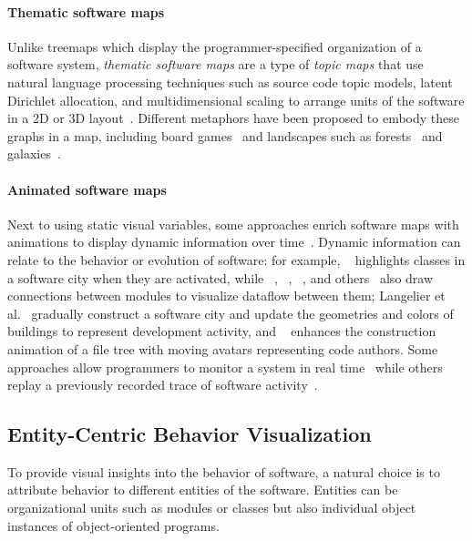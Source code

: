 \paragraph{Thematic software maps}

Unlike treemaps which display the pro\-gram\-mer-specified organization of a software system, \emph{thematic software maps} are a type of \emph{topic maps} that use natural language processing techniques such as source code topic models, latent Dirichlet allocation, and multidimensional scaling to arrange units of the software in a 2D or 3D layout~\cite{atzberger2023visualization}.
Different metaphors have been proposed to embody these graphs in a map, including board games~\cite{atzberger2022visualization} and landscapes such as forests~\cite{atzberger2021softwareforest} and galaxies~\cite{atzberger2021softwaregalaxies}.

\paragraph{Animated software maps}

Next to using static visual variables, some approaches enrich software maps with animations to display dynamic information over time~\cite[sec. 3.4]{lemieux2006visualization}.
Dynamic information can relate to the behavior or evolution of software:
for example, ~\cite{dugerdil2008execution} highlights classes in a software city when they are activated, while ~\cite{dashuber2022trace}, ~\cite{krause2021live}, ~\cite{waller2013synchrovis}, and others~\cite{ciolkowski20173d} also draw connections between modules to visualize dataflow between them;
Langelier et al.~\cite{langelier2008exploring} gradually construct a software city and update the geometries and colors of buildings to represent development activity, and ~\cite{caudwell2010gource} enhances the construction animation of a file tree with moving avatars representing code authors.
Some approaches allow programmers to monitor a system in real time~\cite{fittkau2013live} while others replay a previously recorded trace of software activity~\cite{dugerdil2008execution}.

\subsection{Entity-Centric Behavior Visualization}

To provide visual insights into the behavior of software, a natural choice is to attribute behavior to different entities of the software.
Entities can be organizational units such as modules or classes but also individual object instances of object-oriented programs.

